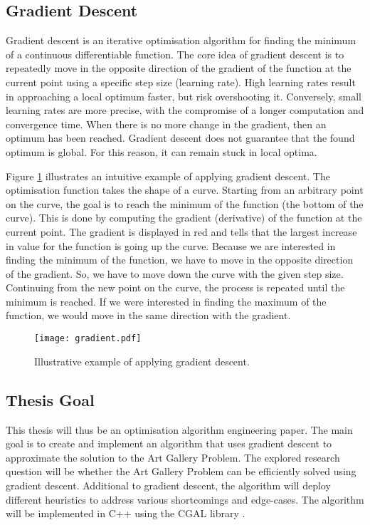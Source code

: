 \newpage
\subsection{Gradient Descent}

Gradient descent is an iterative optimisation algorithm for finding the minimum of a continuous differentiable function. The core idea of gradient descent is to repeatedly move in the opposite direction of the gradient of the function at the current point using a specific step size (learning rate). High learning rates result in approaching a local optimum faster, but risk overshooting it. Conversely, small learning rates are more precise, with the compromise of a longer computation and convergence time.
When there is no more change in the gradient, then an optimum has been reached. Gradient descent does not guarantee that the found optimum is global. For this reason, it can remain stuck in local optima.

Figure \ref{fig:gradient_descent} illustrates an intuitive example of applying gradient descent. The optimisation function takes the shape of a curve. Starting from an arbitrary point on the curve, the goal is to reach the minimum of the function (the bottom of the curve). This is done by computing the gradient (derivative) of the function at the current point. The gradient is displayed in red and tells that the largest increase in value for the function is going up the curve. Because we are interested in finding the minimum of the function, we have to move in the opposite direction of the gradient. So, we have to move down the curve with the given step size. Continuing from the new point on the curve, the process is repeated until the minimum is reached.
If we were interested in finding the maximum of the function, we would move in the same direction with the gradient.

\begin{figure}[h!]
    \centering
    \texttt{[image: gradient.pdf]}
    \caption{Illustrative example of applying gradient descent.}
    \label{fig:gradient_descent}
\end{figure}

\subsection{Thesis Goal}
This thesis will thus be an optimisation algorithm engineering paper. The main goal is to create and implement an algorithm that uses gradient descent to approximate the solution to the Art Gallery Problem. The explored research question will be whether the Art Gallery Problem can be efficiently solved using gradient descent. Additional to gradient descent, the algorithm will deploy different heuristics to address various shortcomings and edge-cases.
The algorithm will be implemented in C++ using the CGAL library \cite{cgal}.


